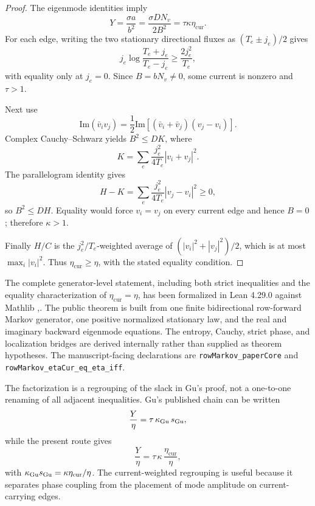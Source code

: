 \documentclass[aps,pre,reprint,groupedaddress,nofootinbib,showkeys,floatfix]{revtex4-2}
\newcommand{\Nv}{N_v}
\newcommand{\ecur}{\eta_{\mathrm{cur}}}
\begin{document}
\begin{proof}
The eigenmode identities imply
\begin{equation}
Y=\frac{\sigma a}{b^2}=\frac{\sigma D\Nv}{2B^2}=\tau\kappa\ecur.
\end{equation}
For each edge, writing the two stationary directional fluxes as $(T_e\pm j_e)/2$ gives
\begin{equation}
j_e\log\frac{T_e+j_e}{T_e-j_e}\ge\frac{2j_e^2}{T_e},
\end{equation}
with equality only at $j_e=0$. Since $B=b\Nv\ne0$, some current is nonzero and $\tau>1$.

Next use
\begin{equation}
\mathrm{Im}(\bar v_i v_j)=\frac12\mathrm{Im}\left[(\bar v_i+\bar v_j)(v_j-v_i)\right].
\end{equation}
Complex Cauchy--Schwarz yields $B^2\le DK$, where
\begin{equation}
K=\sum_e\frac{j_e^2}{4T_e}|v_i+v_j|^2.
\end{equation}
The parallelogram identity gives
\begin{equation}
H-K=\sum_e\frac{j_e^2}{4T_e}|v_j-v_i|^2\ge0,
\end{equation}
so $B^2\le DH$. Equality would force $v_i=v_j$ on every current edge and hence $B=0$; therefore $\kappa>1$.

Finally $H/C$ is the $j_e^2/T_e$-weighted average of $(|v_i|^2+|v_j|^2)/2$, which is at most $\max_i|v_i|^2$. Thus $\ecur\ge\eta$, with the stated equality condition.
\end{proof}

The complete generator-level statement, including both strict inequalities and the equality characterization of $\ecur=\eta$, has been formalized in Lean 4.29.0 against Mathlib \cite{Lean4},\cite{Mathlib}. The public theorem is built from one finite bidirectional row-forward Markov generator, one positive normalized stationary law, and the real and imaginary backward eigenmode equations. The entropy, Cauchy, strict phase, and localization bridges are derived internally rather than supplied as theorem hypotheses. The manuscript-facing declarations are \texttt{rowMarkov\_paperCore} and \texttt{rowMarkov\_etaCur\_eq\_eta\_iff}.

The factorization is a regrouping of the slack in Gu's proof, not a one-to-one renaming of all adjacent inequalities. Gu's published chain can be written
\begin{equation}
\frac{Y}{\eta}=\tau\,\kappa_{\rm Gu}\,s_{\rm Gu},
\end{equation}
while the present route gives
\begin{equation}
\frac{Y}{\eta}=\tau\,\kappa\,\frac{\ecur}{\eta},
\end{equation}
with $\kappa_{\rm Gu}s_{\rm Gu}=\kappa\ecur/\eta$. The current-weighted regrouping is useful because it separates phase coupling from the placement of mode amplitude on current-carrying edges.
\end{document}
